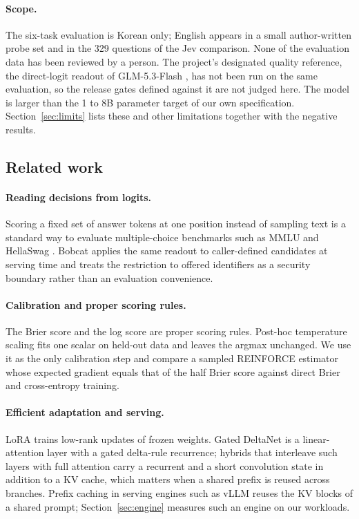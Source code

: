 \paragraph{Scope.}
The six-task evaluation is Korean only; English appears in a small author-written probe set
and in the 329 questions of the Jev comparison. None of the evaluation data has been reviewed by a person. The project's designated
quality reference, the direct-logit readout of GLM-5.3-Flash \citep{glm53flash}, has not
been run on the same evaluation, so the release gates defined against it are not judged
here. The model is larger than the 1 to 8B
parameter target of our own specification. Section~\ref{sec:limits} lists these and other
limitations together with the negative results.

\subsection{Related work}
\label{sec:related}

\paragraph{Reading decisions from logits.}
Scoring a fixed set of answer tokens at one position instead of sampling text is a
standard way to evaluate multiple-choice benchmarks such as MMLU \citep{hendrycks2021mmlu}
and HellaSwag \citep{zellers2019hellaswag}. Bobcat applies the same readout to caller-defined
candidates at serving time and treats the restriction to offered identifiers as a security
boundary rather than an evaluation convenience.

\paragraph{Calibration and proper scoring rules.}
The Brier score \citep{brier1950} and the log score are proper scoring rules. Post-hoc
temperature scaling \citep{guo2017calibration} fits one scalar on held-out data and leaves
the argmax unchanged. We use it as the only calibration step and compare a sampled
REINFORCE estimator \citep{williams1992} whose expected gradient equals that of the half
Brier score against direct Brier and cross-entropy training.

\paragraph{Efficient adaptation and serving.}
LoRA \citep{hu2021lora} trains low-rank updates of frozen weights. Gated DeltaNet
\citep{yang2024gdn} is a linear-attention layer with a gated delta-rule recurrence;
hybrids that interleave such layers with full attention carry a recurrent and a short
convolution state in addition to a KV cache, which matters when a shared prefix is reused
across branches. Prefix caching in serving engines such as vLLM \citep{kwon2023vllm}
reuses the KV blocks of a shared prompt; Section~\ref{sec:engine} measures such an engine on
our workloads.

